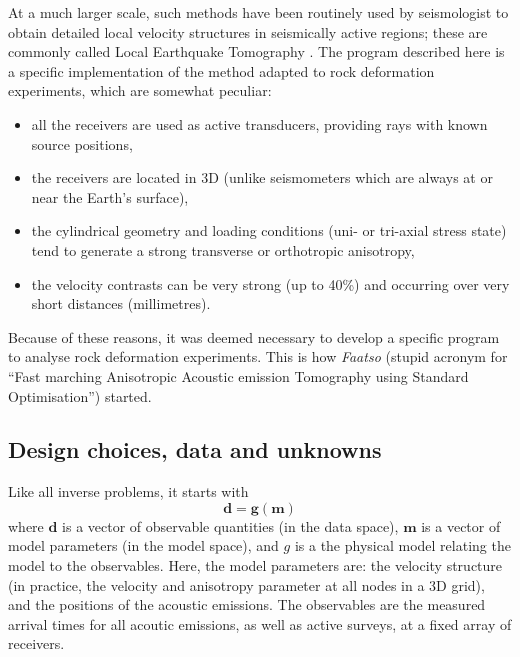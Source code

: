 \documentclass{article}
\renewcommand\vec[1]{\mathbf{#1}}
\begin{document}
At a much larger scale, such methods have been routinely used by seismologist to obtain detailed local velocity structures in seismically active regions; these are commonly called Local Earthquake Tomography \citep[e.g.][]{aki76,thurber83}. The program described here is a specific implementation of the method adapted to rock deformation experiments, which are somewhat peculiar:
\begin{itemize}
\item all the receivers are used as active transducers, providing rays with known source positions,
\item the receivers are located in 3D (unlike seismometers which are always at or near the Earth's surface),
\item the cylindrical geometry and loading conditions (uni- or tri-axial stress state) tend to generate a strong transverse or orthotropic anisotropy,
\item the velocity contrasts can be very strong (up to 40\%) and occurring over very short distances (millimetres).
\end{itemize}
Because of these reasons, it was deemed necessary to develop a specific program to analyse rock deformation experiments. This is how \emph{Faatso} (stupid acronym for ``Fast marching Anisotropic Acoustic emission Tomography using Standard Optimisation'') started.

\subsection{Design choices, data and unknowns}

Like all inverse problems, it starts with \citep{tarantola05}
\begin{equation}\label{eq:d=g(m)}
  \vec{d} = \vec{g}(\vec{m})
\end{equation}
where $\vec{d}$ is a vector of observable quantities (in the data space), $\vec{m}$ is a vector of model parameters (in the model space), and $g$ is a the physical model relating the model to the observables. Here, the model parameters are: the velocity structure (in practice, the velocity and anisotropy parameter at all nodes in a 3D grid), and the positions of the acoustic emissions. The observables are the measured arrival times for all acoutic emissions, as well as active surveys, at a fixed array of receivers.
\end{document}
